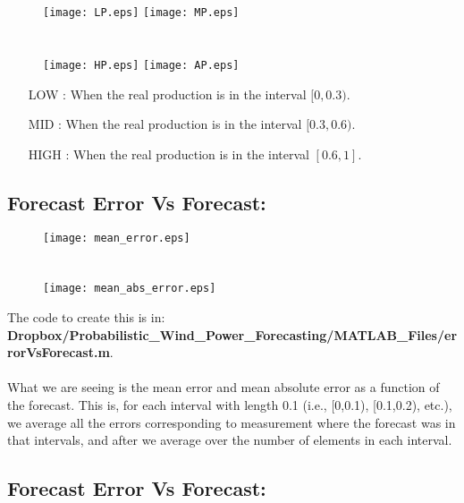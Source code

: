 \documentclass[12pt]{article}
\theoremstyle{definition}
\theoremstyle{remark}
\begin{document}
\begin{figure}[ht!]
\centering
{\texttt{[image: LP.eps]}}\quad
{\texttt{[image: MP.eps]}}\\
\quad\\
\quad\\
{\texttt{[image: HP.eps]}}\quad
{\texttt{[image: AP.eps]}}
\end{figure}

\begin{enumerate}
\item[LOW]: When the real production is in the interval $[0,0.3)$.
\item[MID]: When the real production is in the interval $[0.3,0.6)$.
\item[HIGH]: When the real production is in the interval $[0.6,1]$.
\end{enumerate}

\pagebreak 

\subsection*{Forecast Error Vs Forecast:}

\begin{figure}[ht!]
\centering
{\texttt{[image: mean\_error.eps]}}\\
\quad\\
\quad\\
{\texttt{[image: mean\_abs\_error.eps]}}
\end{figure}

The code to create this is in:\\
\textbf{Dropbox/Probabilistic\_Wind\_Power\_Forecasting/MATLAB\_Files/errorVsForecast.m}.\\
\quad\\
What we are seeing is the mean error and mean absolute error as a function of the forecast. This is, for each interval with length 0.1 (i.e., [0,0.1), [0.1,0.2), etc.), we average all the errors corresponding to measurement where the forecast was in that intervals, and after we average over the number of elements in each interval.

\pagebreak 

\subsection*{Forecast Error Vs Forecast:}
\end{document}
